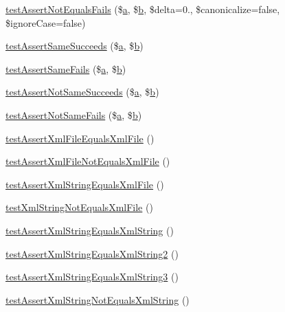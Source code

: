 \begin{DoxyCompactItemize}
\item 
\mbox{\hyperlink{class_framework___assert_test_ac1e610782c9e5d7ab2115c4d7052727d}{test\+Assert\+Not\+Equals\+Fails}} (\$\mbox{\hyperlink{interfacea}{a}}, \$\mbox{\hyperlink{interfaceb}{b}}, \$delta=0., \$canonicalize=false, \$ignore\+Case=false)
\item 
\mbox{\hyperlink{class_framework___assert_test_a7f51d6996f09a44455dba8641a4317d7}{test\+Assert\+Same\+Succeeds}} (\$\mbox{\hyperlink{interfacea}{a}}, \$\mbox{\hyperlink{interfaceb}{b}})
\item 
\mbox{\hyperlink{class_framework___assert_test_a72c9d1e8310e1be82416f6369e43b4af}{test\+Assert\+Same\+Fails}} (\$\mbox{\hyperlink{interfacea}{a}}, \$\mbox{\hyperlink{interfaceb}{b}})
\item 
\mbox{\hyperlink{class_framework___assert_test_ad412b22f792314b19ecb3dca83a6d110}{test\+Assert\+Not\+Same\+Succeeds}} (\$\mbox{\hyperlink{interfacea}{a}}, \$\mbox{\hyperlink{interfaceb}{b}})
\item 
\mbox{\hyperlink{class_framework___assert_test_af8e95e14ab608346c83a38d3ac6c23b8}{test\+Assert\+Not\+Same\+Fails}} (\$\mbox{\hyperlink{interfacea}{a}}, \$\mbox{\hyperlink{interfaceb}{b}})
\item 
\mbox{\hyperlink{class_framework___assert_test_aa70894f573d74a5f8c4a99b053417b1a}{test\+Assert\+Xml\+File\+Equals\+Xml\+File}} ()
\item 
\mbox{\hyperlink{class_framework___assert_test_ab384c3daade32fd4f481d13ba06f9309}{test\+Assert\+Xml\+File\+Not\+Equals\+Xml\+File}} ()
\item 
\mbox{\hyperlink{class_framework___assert_test_a479546ac84a9b0f1673815460939485c}{test\+Assert\+Xml\+String\+Equals\+Xml\+File}} ()
\item 
\mbox{\hyperlink{class_framework___assert_test_a5b3a46d76084b7f39aa62c2bac307302}{test\+Xml\+String\+Not\+Equals\+Xml\+File}} ()
\item 
\mbox{\hyperlink{class_framework___assert_test_aa871631938001f7dd5c0c4f4a0103b4c}{test\+Assert\+Xml\+String\+Equals\+Xml\+String}} ()
\item 
\mbox{\hyperlink{class_framework___assert_test_add2628e8bfef1c22b2db704062231134}{test\+Assert\+Xml\+String\+Equals\+Xml\+String2}} ()
\item 
\mbox{\hyperlink{class_framework___assert_test_ae8607e1dea907a5c2111665318993dac}{test\+Assert\+Xml\+String\+Equals\+Xml\+String3}} ()
\item 
\mbox{\hyperlink{class_framework___assert_test_a1d9b7206dcf98589f20dc72a1549f319}{test\+Assert\+Xml\+String\+Not\+Equals\+Xml\+String}} ()

\end{DoxyCompactItemize}
